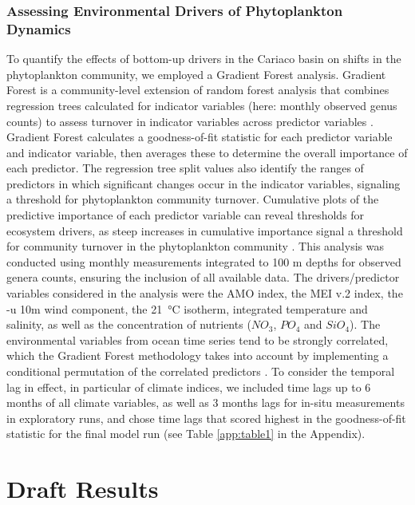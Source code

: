 \documentclass[draft]{agujournal2019}
\begin{document}
    \subsubsection{Assessing Environmental Drivers of Phytoplankton Dynamics}
    To quantify the effects of bottom-up drivers in the Cariaco basin on shifts in the phytoplankton community, we employed a Gradient Forest analysis. Gradient Forest is a community-level extension of random forest analysis that combines regression trees calculated for indicator variables (here: monthly observed genus counts) to assess turnover in indicator variables across predictor variables \cite{pitcher_example_2012, large_critical_2015, tam_comparing_2017}. Gradient Forest calculates a goodness-of-fit statistic for each predictor variable and indicator variable, then averages these to determine the overall importance of each predictor. The regression tree split values also identify the ranges of predictors in which significant changes occur in the indicator variables, signaling a threshold for phytoplankton community turnover. Cumulative plots of the predictive importance of each predictor variable can reveal thresholds for ecosystem drivers, as steep increases in cumulative importance signal a threshold for community turnover in the phytoplankton community \cite{tam_comparing_2017}. This analysis was conducted using monthly measurements integrated to 100 m depths for observed genera counts, ensuring the inclusion of all available data. The drivers/predictor variables considered in the analysis were the AMO index, the MEI v.2 index, the -u 10m wind component, the \qty{21}{\celsius} isotherm, integrated temperature and salinity, as well as the concentration of nutrients ($NO_3$, $PO_4$ and $SiO_4$). The environmental variables from ocean time series tend to be strongly correlated, which the Gradient Forest methodology takes into account by implementing a conditional permutation of the correlated predictors \cite{ellis_gradient_2012}. To consider the temporal lag in effect, in particular of climate indices, we included time lags up to 6 months of all climate variables, as well as 3 months lags for in-situ measurements in exploratory runs, and chose time lags that scored highest in the goodness-of-fit statistic for the final model run (see Table \ref{app:table1} in the Appendix).
    


\section{Draft Results}
\end{document}

